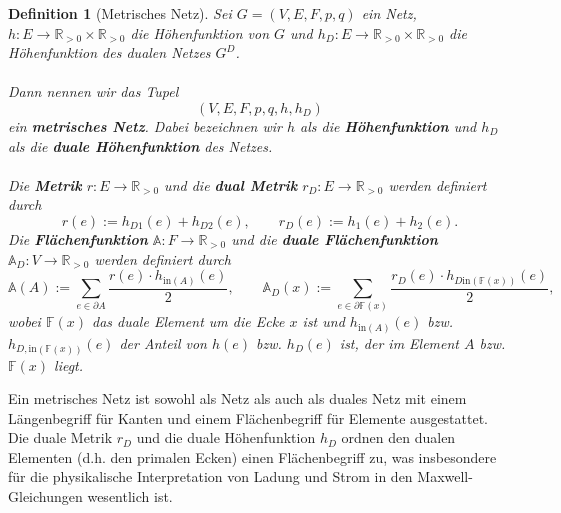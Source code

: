 \documentclass[11pt,a4paper,leqno]{report}
\newtheorem{definition}[theorem]{Definition}
\numberwithin{equation}{chapter}
\begin{document}
\begin{definition}[Metrisches Netz]
	Sei \(G=(V,E,F, p,q)\) ein Netz,
	\(h \colon E \to \mathbb{R}_{>0} \times \mathbb{R}_{>0}\) die
	Höhenfunktion von \(G\) und \(h_D \colon E \to \mathbb{R}_{>0} \times \mathbb{R}_{>0}\) die
	Höhenfunktion des dualen Netzes \(G^D\).\\
	\\
	Dann nennen wir das Tupel
	\[
	(V, E, F, p, q, h, h_D)
	\]
	ein \textbf{metrisches Netz}.
	 Dabei bezeichnen wir \(h\) als die
	\textbf{Höhenfunktion} und \(h_D\) als die \textbf{duale Höhenfunktion} des Netzes.\\
	\\
	Die \textbf{Metrik} \(r \colon E \to \mathbb{R}_{>0}\) und die
	\textbf{dual Metrik} \(r_D \colon E \to \mathbb{R}_{>0}\) werden
	definiert durch
	\[
	r(e) := h_{D1}(e) + h_{D2}(e), \qquad
	r_D(e) := h_{1}(e) + h_{2}(e).
	\]
	Die \textbf{Flächenfunktion} \(\mathbb{A} \colon F \to \mathbb{R}_{>0}\) und
	die \textbf{duale Flächenfunktion} \(\mathbb{A}_D \colon V \to
	\mathbb{R}_{>0}\) werden definiert durch
	\[
	\mathbb{A}(A) := \sum_{e \in \partial A} \frac{r(e) \cdot h_{\mathrm{in}(A)}(e)}{2},
	\qquad
	\mathbb{A}_D(x) := \sum_{e \in \partial \mathbb{F}(x)} \frac{r_D(e) \cdot
		h_{D\mathrm{in}(\mathbb{F}(x))}(e)}{2},
	\]
	wobei \(\mathbb{F}(x)\) das duale Element um die Ecke \(x\) ist und
	\(h_{\mathrm{in}(A)}(e)\) bzw. \(h_{D,\mathrm{in}(\mathbb{F}(x))}(e)\) der
	Anteil von \(h(e)\) bzw. \(h_D(e)\) ist, der im Element \(A\) bzw.
	\(\mathbb{F}(x)\) liegt.
\end{definition}
\noindent
Ein metrisches Netz ist sowohl als Netz als auch als duales Netz mit
einem Längenbegriff für Kanten und einem Flächenbegriff für Elemente
ausgestattet. Die duale Metrik \(r_D\) und die duale Höhenfunktion
\(h_D\) ordnen den dualen Elementen (d.h. den primalen Ecken) einen
Flächenbegriff zu, was insbesondere für die physikalische
Interpretation von Ladung und Strom in den Maxwell-Gleichungen
wesentlich ist.
\end{document}

